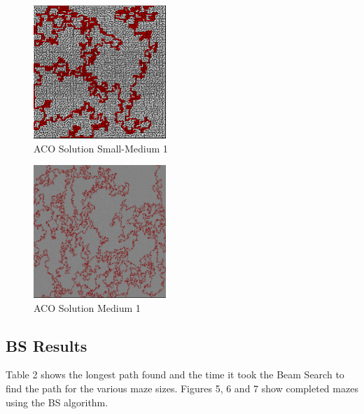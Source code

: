 \documentclass[conference]{IEEEtran}
\begin{document}
        \begin{figure}[H]
            \centering
            \includegraphics[width=5cm]{images/ACO_SM1.png}
            \caption{ACO Solution Small-Medium 1}
            \label{ACO_SM1}
        \end{figure}
        \begin{figure}[H]
            \centering
            \includegraphics[width=5cm]{images/ACO_M1.png}
            \caption{ACO Solution Medium 1}
            \label{ACO_M1}
        \end{figure}
    \subsection{BS Results}
        Table 2 shows the longest path found and the time it took the Beam Search to find the path for the various maze sizes.
        Figures 5, 6 and 7 show completed mazes using the BS algorithm.
\end{document}
